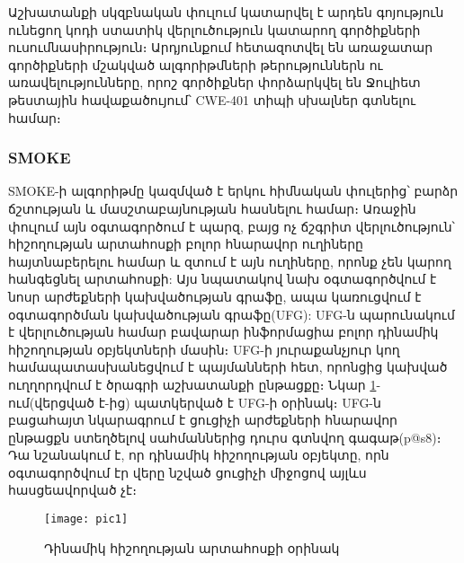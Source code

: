     {
        Աշխատանքի սկզբնական փուլում կատարվել է արդեն գոյություն ունեցող կոդի ստատիկ վերլուծություն կատարող գործիքների
        ուսումնասիրություն։ Արդյունքում հետազոտվել են առաջատար գործիքների մշակված ալգորիթմների թերություններն ու
        առավելությունները, որոշ գործիքներ փորձարկվել են Ջուլիետ թեստային հավաքածույում՝ CWE-401 տիպի սխալներ\cite{CWE401} գտնելու համար։

        \subsubsection{SMOKE}
        SMOKE\cite{Fan2019}-ի ալգորիթմը կազմված է երկու հիմնական փուլերից՝ բարձր ճշտության և մասշտաբայնության հասնելու համար։
        Առաջին փուլում այն օգտագործում է պարզ, բայց ոչ ճշգրիտ վերլուծություն՝ հիշողության արտահոսքի բոլոր հնարավոր ուղիները
        հայտնաբերելու համար և զտում է այն ուղիները, որոնք չեն կարող հանգեցնել արտահոսքի: Այս նպատակով նախ օգտագործվում է նոսր
        արժեքների կախվածության գրաֆը, ապա կառուցվում է օգտագործման կախվածության գրաֆը(UFG): UFG-ն պարունակում է վերլուծության
        համար բավարար ինֆորմացիա բոլոր դինամիկ հիշողության օբյեկտների մասին։ UFG-ի յուրաքանչյուր կող համապատասխանեցվում է պայմանների հետ,
        որոնցից կախված ուղղորդվում է ծրագրի աշխատանքի ընթացքը։
        Նկար \ref{fig:figure1}-ում(վերցված է\cite{Fan2019}-ից) պատկերված է UFG-ի օրինակ։ UFG-ն բացահայտ նկարագրում է ցուցիչի արժեքների հնարավոր
        ընթացքն ստեղծելով սահմաններից դուրս գտնվող գագաթ(p@s8)։ Դա նշանակում է, որ դինամիկ հիշողության օբյեկտը, որն
        օգտագործվում էր վերը նշված ցուցիչի միջոցով այլևս հասցեավորված չէ։

        \begin{figure}[h]
            \centering
            \texttt{[image: pic1]}
            \caption{Դինամիկ հիշողության արտահոսքի օրինակ}
            \label{fig:figure1}
        \end{figure}

}
